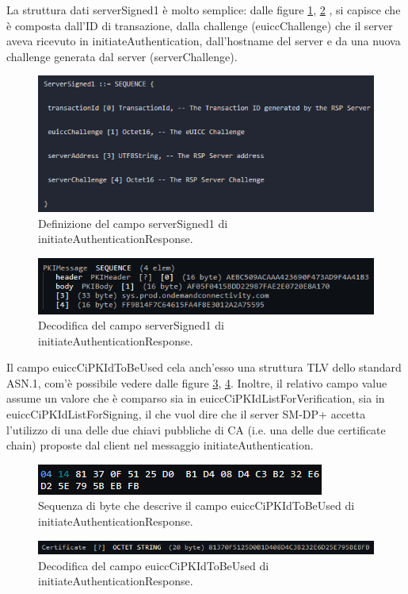 \documentclass[10pt, oneside]{book}
\begin{document}
La struttura dati serverSigned1 è molto semplice: dalle figure \ref{fig:def-serverSigned1}, \ref{fig:decode-serverSigned1} \cite{RSP-definitions}, si capisce che è composta dall'ID di transazione, dalla challenge (euiccChallenge) che il server aveva ricevuto in initiateAuthentication, dall'hostname del server e da una nuova challenge generata dal server (serverChallenge).\\
\begin{figure}
\includegraphics[width=\linewidth]{def-serverSigned1.png}
\caption{Definizione del campo serverSigned1 di initiateAuthenticationResponse.}
\label{fig:def-serverSigned1}
\end{figure}
\begin{figure}
\includegraphics[width=\linewidth]{decode-serverSigned1.png}
\caption{Decodifica del campo serverSigned1 di initiateAuthenticationResponse.}
\label{fig:decode-serverSigned1}
\end{figure}

Il campo euiccCiPKIdToBeUsed cela anch'esso una struttura TLV dello standard ASN.1, com'è possibile vedere dalle figure \ref{fig:asn1-euiccCiPKIdToBeUsed}, \ref{fig:decode-euiccCiPKIdToBeUsed}. Inoltre, il relativo campo value assume un valore che è comparso sia in euiccCiPKIdListForVerification, sia in euiccCiPKIdListForSigning, il che vuol dire che il server SM-DP+ accetta l'utilizzo di una delle due chiavi pubbliche di CA (i.e. una delle due certificate chain) proposte dal client nel messaggio initiateAuthentication.\\
\begin{figure}
\includegraphics[width=\linewidth]{asn1-euiccCiPKIdToBeUsed.png}
\caption{Sequenza di byte che descrive il campo euiccCiPKIdToBeUsed di initiateAuthenticationResponse.}
\label{fig:asn1-euiccCiPKIdToBeUsed}
\end{figure}
\begin{figure}
\includegraphics[width=\linewidth]{decode-euiccCiPKIdToBeUsed.png}
\caption{Decodifica del campo euiccCiPKIdToBeUsed di initiateAuthenticationResponse.}
\label{fig:decode-euiccCiPKIdToBeUsed}
\end{figure}
\end{document}
